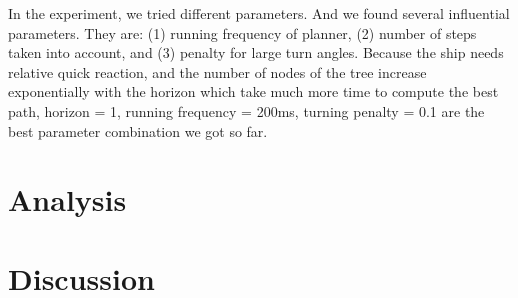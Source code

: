 \documentclass[10pt,draft,conference]{IEEEtran}
\begin{document}
In the experiment, we tried different parameters. And we found several influential parameters. They are: (1) running frequency of planner, (2) number of steps taken into account, and (3) penalty for large turn angles. Because the ship needs relative quick reaction, and the number of nodes of the tree increase exponentially with the horizon which take much more time to compute the best path, horizon = 1, running frequency = 200ms, turning penalty = 0.1 are the best parameter combination we got so far. 


\section{Analysis}


\section{Discussion}




\end{document}
